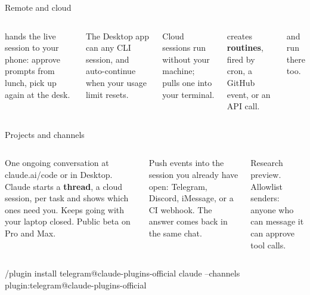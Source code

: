 \documentclass[aspectratio=169,11pt,t]{beamer}
\begin{document}
\begin{frame}{Remote and cloud}
  \begin{columns}[T,onlytextwidth]
      \par\vspace{0.35em}\small
       hands the live session to your phone: approve prompts from lunch, pick up again at the desk.\par\vspace{0.45em}
      The Desktop app can  any CLI session, and auto-continue when your usage limit resets.
      \par\vspace{0.35em}\small
      Cloud sessions run without your machine;  pulls one into your terminal.\par\vspace{0.45em}
       creates \textbf{routines}, fired by cron, a GitHub event, or an API call.\par\vspace{0.45em}
       and  run there too.
  \end{columns}
\end{frame}

\begin{frame}[fragile]{Projects and channels}
  \begin{columns}[T,onlytextwidth]
      \par\vspace{0.35em}\small
      One ongoing conversation at claude.ai/code or in Desktop. Claude starts a \textbf{thread}, a cloud session, per task and shows which ones need you. Keeps going with your laptop closed. Public beta on Pro and Max.
      \par\vspace{0.35em}\small
      Push events into the session you already have open: Telegram, Discord, iMessage, or a CI webhook. The answer comes back in the same chat.\par\vspace{0.3em}
      {\footnotesize\color{muted}Research preview. Allowlist senders: anyone who can message it can approve tool calls.}
  \end{columns}\par\vspace{0.5em}
\begin{code}
/plugin install telegram@claude-plugins-official
claude --channels plugin:telegram@claude-plugins-official
\end{code}
\end{frame}
\end{document}
